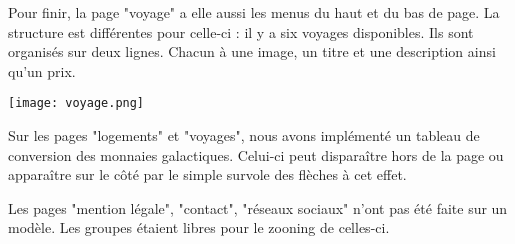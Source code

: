 \begin{minipage}{0.3 \linewidth}
    Pour finir, la page "voyage" a elle aussi les menus du haut et du bas de page.
    La structure est différentes pour celle-ci : il y a six voyages disponibles.
    Ils sont organisés sur deux lignes.
    Chacun à une image, un titre et une description ainsi qu'un prix.
\end{minipage} \hfill
\begin{minipage}{0.5 \linewidth}
    \hspace{-2cm}
    \texttt{[image: voyage.png]}
\end{minipage}

Sur les pages "logements" et "voyages", nous avons implémenté un tableau de conversion des monnaies galactiques. 
Celui-ci peut disparaître hors de la page ou apparaître sur le côté par le simple survole des flèches à cet effet.

Les pages "mention légale", "contact", "réseaux sociaux" n'ont pas été faite sur un modèle. 
Les groupes étaient libres pour le zooning de celles-ci. 

\newpage